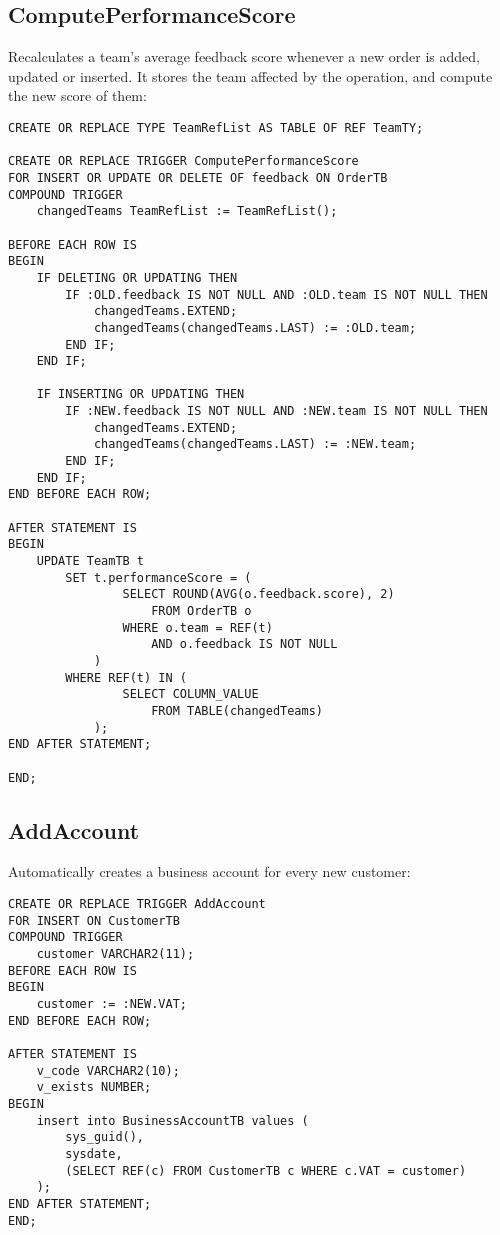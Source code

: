 \subsection*{ComputePerformanceScore}
Recalculates a team's average feedback score whenever a new order is added, updated or inserted. It stores the team affected by the operation, and compute the new score of them:
\begin{lstlisting}
CREATE OR REPLACE TYPE TeamRefList AS TABLE OF REF TeamTY;

CREATE OR REPLACE TRIGGER ComputePerformanceScore
FOR INSERT OR UPDATE OR DELETE OF feedback ON OrderTB
COMPOUND TRIGGER
    changedTeams TeamRefList := TeamRefList();

BEFORE EACH ROW IS
BEGIN
    IF DELETING OR UPDATING THEN
        IF :OLD.feedback IS NOT NULL AND :OLD.team IS NOT NULL THEN
            changedTeams.EXTEND;
            changedTeams(changedTeams.LAST) := :OLD.team;
        END IF;
    END IF;

    IF INSERTING OR UPDATING THEN
        IF :NEW.feedback IS NOT NULL AND :NEW.team IS NOT NULL THEN
            changedTeams.EXTEND;
            changedTeams(changedTeams.LAST) := :NEW.team;
        END IF;
    END IF;
END BEFORE EACH ROW;

AFTER STATEMENT IS
BEGIN
    UPDATE TeamTB t
        SET t.performanceScore = (
                SELECT ROUND(AVG(o.feedback.score), 2)
                    FROM OrderTB o
                WHERE o.team = REF(t)
                    AND o.feedback IS NOT NULL
            )
        WHERE REF(t) IN (
                SELECT COLUMN_VALUE
                    FROM TABLE(changedTeams)
            );
END AFTER STATEMENT;

END;
\end{lstlisting}

\subsection*{AddAccount}
Automatically creates a business account for every new customer:
\begin{lstlisting}
CREATE OR REPLACE TRIGGER AddAccount
FOR INSERT ON CustomerTB
COMPOUND TRIGGER
    customer VARCHAR2(11);
BEFORE EACH ROW IS
BEGIN
    customer := :NEW.VAT;
END BEFORE EACH ROW;

AFTER STATEMENT IS
    v_code VARCHAR2(10);
    v_exists NUMBER;
BEGIN
    insert into BusinessAccountTB values (
        sys_guid(),
        sysdate, 
        (SELECT REF(c) FROM CustomerTB c WHERE c.VAT = customer)
    );
END AFTER STATEMENT;
END;
\end{lstlisting}

